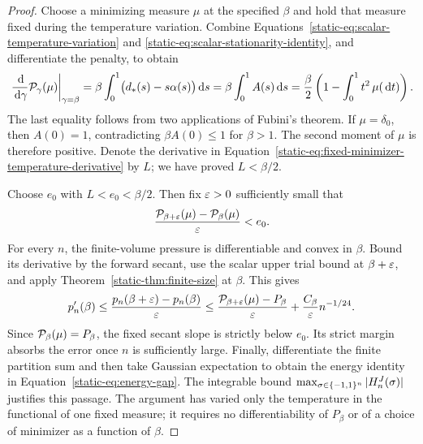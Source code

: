 \begin{proof}
Choose a minimizing measure $\mu$ at the specified $\beta$ and
hold that measure fixed during the temperature variation. Combine
Equations~\eqref{static-eq:scalar-temperature-variation} and
\eqref{static-eq:scalar-stationarity-identity}, and differentiate
the penalty, to obtain
\begin{equation}\label{static-eq:fixed-minimizer-temperature-derivative}
 \left.\frac{\,\mathrm d}{\,\mathrm d\gamma}\mathcal P_\gamma(\mu)\right|_{\gamma=\beta}
 =\beta\int_0^1\bigl(d_*(s)-s\alpha(s)\bigr)\,\mathrm d s
 =\beta\int_0^1 A(s)\,\mathrm d s
 =\frac{\beta}{2}\left(1-\int_0^1t^2\,\mu(\,\mathrm d t)\right).
\end{equation}
The last equality follows from two applications of Fubini's theorem.
If $\mu=\delta_0$, then $A(0)=1$, contradicting
$\beta A(0)\le1$ for $\beta>1$. The second moment of $\mu$ is
therefore positive. Denote the derivative in
Equation~\eqref{static-eq:fixed-minimizer-temperature-derivative}
by $L$; we have proved $L<\beta/2$.

Choose $e_0$ with $L<e_0<\beta/2$. Then fix $\varepsilon>0$
sufficiently small that
\[
 \frac{\mathcal P_{\beta+\varepsilon}(\mu)-\mathcal P_\beta(\mu)}{\varepsilon}<e_0.
\]
For every $n$, the finite-volume pressure is differentiable and
convex in $\beta$. Bound its derivative by the forward secant,
use the scalar upper trial bound at $\beta+\varepsilon$, and apply
Theorem~\ref{static-thm:finite-size} at $\beta$. This gives
\[
 p_n'(\beta)
 \le\frac{p_n(\beta+\varepsilon)-p_n(\beta)}{\varepsilon}
 \le\frac{\mathcal P_{\beta+\varepsilon}(\mu)-P_\beta}{\varepsilon}
         +\frac{C_\beta}{\varepsilon}n^{-1/24}.
\]
Since $\mathcal P_\beta(\mu)=P_\beta$, the fixed secant slope is
strictly below $e_0$. Its strict margin absorbs the error once $n$
is sufficiently large. Finally, differentiate the finite partition
sum and then take Gaussian expectation to obtain the energy identity
in Equation~\eqref{static-eq:energy-gap}. The integrable bound
$\max_{\sigma\in\{-1,1\}^n}|H_n^J(\sigma)|$ justifies this passage.
The argument has varied only the temperature in the functional of
one fixed measure; it requires no differentiability of $P_\beta$
or of a choice of minimizer as a function of $\beta$.
\end{proof}

